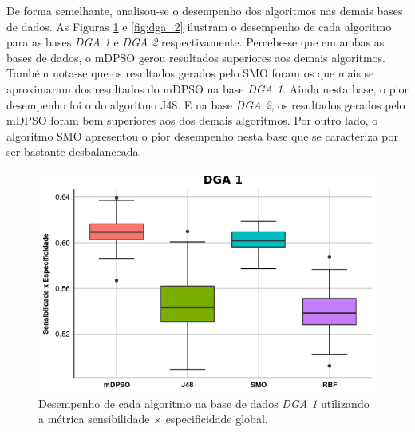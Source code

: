 \documentclass[
	12pt,				%
	openany,			%
	oneside,	
	a4paper,			%
	brazil,				%
	]{unimontes-ppgmsc-abntex2}
\begin{document}
\begin{table}[!ht]
\setlength{\arrayrulewidth}{.2em}
\vspace{12pt}
\centering{}
\caption{p-valor medido para o produto da sensibilidade pela especificidade global de cada algoritmo na base de dados {\em Diabetes}.}
\label{tab:pvalor_diabetes}
\end{table}

De forma semelhante, analisou-se o desempenho dos algoritmos nas demais bases de dados. As Figuras \ref{fig:dga_1} e \ref{fig:dga_2} ilustram o desempenho de cada algoritmo para as bases {\em DGA 1} e {\em DGA 2} respectivamente. Percebe-se que em ambas as bases de dados, o mDPSO gerou resultados superiores aos demais algoritmos. Também nota-se que os resultados gerados pelo SMO foram os que mais se aproximaram dos resultados do mDPSO na base {\em DGA 1}. Ainda nesta base, o pior desempenho foi o do algoritmo J48. E na base {\em DGA 2}, os resultados gerados pelo mDPSO foram bem superiores aos dos demais algoritmos. Por outro lado, o algoritmo SMO apresentou o pior desempenho nesta base que se caracteriza por ser bastante desbalanceada. 

\begin{figure}[!ht]
\centering
\includegraphics[scale=.7]{graficos/DGA1}
\caption{Desempenho de cada algoritmo na base de dados {\em DGA 1} utilizando a métrica sensibilidade $\times$ especificidade global.}
\label{fig:dga_1}
\end{figure}
\end{document}
